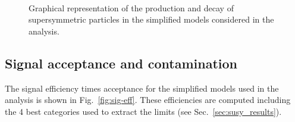 \begin{figure}[h!]
  \begin{center}
     ~~
     ~~
     \\
    \caption{
      Graphical representation of the production and decay of supersymmetric particles in the 
      simplified models considered in the analysis. 
    }
    \label{fig:simplified-models}
  \end{center}
\end{figure}



\subsection{Signal acceptance and contamination}
\label{sec:sig-accept-contam}
The signal efficiency times acceptance for the simplified models used in the analysis 
is shown in Fig.~\ref{fig:sig-eff}. 
These efficiencies are computed including the 4 best categories used to extract the limits (see Sec.~\ref{sec:susy_results}).

